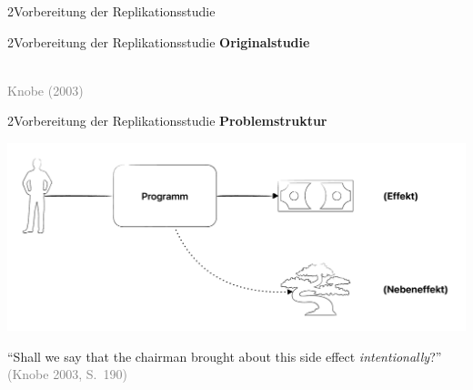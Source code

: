 \documentclass[xcolor=table,9pt,aspectratio=169]{beamer}
\begin{document}
\begin{frame}
\begin{overlayarea}{\textwidth}{0.81\paperheight}{
   \vspace*{11mm}
   \textcolor{uolblue}
   {2\hspace*{1em}Vorbereitung der Replikationsstudie}
}
\end{overlayarea}
\end{frame}


\begin{frame}{\vspace*{10mm}2\hspace*{1em}Vorbereitung der Replikationsstudie}
\textbf{Originalstudie}\\
\begin{center}
   \\
   \textcolor{gray}{Knobe (2003)}
\end{center}
\end{frame}


\begin{frame}{\vspace*{10mm}2\hspace*{1em}Vorbereitung der Replikationsstudie}
\textbf{Problemstruktur}\\
\begin{center}
   \includegraphics[width=0.75\linewidth]{figures/replication_knobe_structure.pdf}\\
\end{center}
\enquote{Shall we say that the chairman brought about this side effect \textit{intentionally}?}\\
\textcolor{gray}{(Knobe 2003, S.~190)}
\bigskip
\end{frame}
\end{document}
